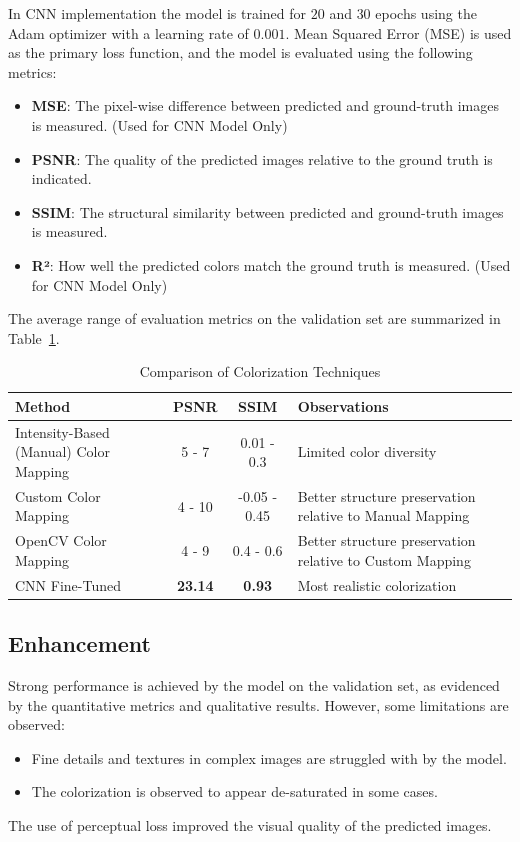 \documentclass[conference]{IEEEtran}
\begin{document}
\begin{itemize}
In CNN implementation the model is trained for $20$ and $30$ epochs using the Adam optimizer with a learning rate of $0.001$. Mean Squared Error (MSE) is used as the primary loss function, and the model is evaluated using the following metrics:
\begin{itemize}
    \item \textbf{MSE}: The pixel-wise difference between predicted and ground-truth images is measured. (Used for CNN Model Only)
    \item \textbf{PSNR}: The quality of the predicted images relative to the ground truth is indicated.
    \item \textbf{SSIM}: The structural similarity between predicted and ground-truth images is measured.
    \item \textbf{R²}: How well the predicted colors match the ground truth is measured. (Used for CNN Model Only)
\end{itemize}
\end{itemize}
The average range of evaluation metrics on the validation set are summarized in Table~\ref{table:metrics_results}.

\begin{table}[t]
\centering
\renewcommand{\arraystretch}{1.1} %
\setlength{\tabcolsep}{4pt} %
\begin{tabular}{|p{2.5cm}|c|c|p{3.3cm}|}  %
\hline
\textbf{Method} & \textbf{PSNR} & \textbf{SSIM} & \textbf{Observations} \\ \hline
Intensity-Based (Manual) Color Mapping & 5 - 7 & 0.01 - 0.3 & Limited color diversity \\ \hline
Custom Color Mapping & 4 - 10 & -0.05 - 0.45 & Better structure preservation relative to Manual Mapping \\ \hline
OpenCV Color Mapping & 4 - 9 & 0.4 - 0.6 & Better structure preservation relative to Custom Mapping \\ \hline
CNN Fine-Tuned & \textbf{23.14} & \textbf{0.93} & Most realistic colorization \\ \hline
\end{tabular}
\caption{Comparison of Colorization Techniques}
\label{table:metrics_results}
\end{table}


\subsection{Enhancement}
Strong performance is achieved by the model on the validation set, as evidenced by the quantitative metrics and qualitative results. However, some limitations are observed:
\begin{itemize}
    \item Fine details and textures in complex images are struggled with by the model.
    \item The colorization is observed to appear de-saturated in some cases.
\end{itemize}
The use of perceptual loss improved the visual quality of the predicted images.
\end{document}
